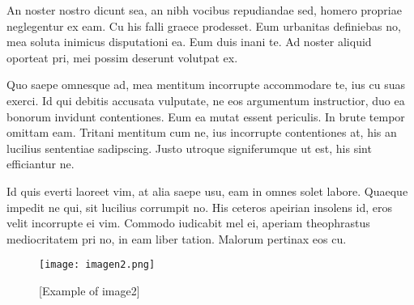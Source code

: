 An noster nostro dicunt sea, an nibh vocibus repudiandae sed, homero propriae neglegentur ex eam. Cu his falli graece prodesset. Eum urbanitas definiebas no, mea soluta inimicus disputationi ea. Eum duis inani te. Ad noster aliquid oporteat pri, mei possim deserunt volutpat ex.

Quo saepe omnesque ad, mea mentitum incorrupte accommodare te, ius cu suas exerci. Id qui debitis accusata vulputate, ne eos argumentum instructior, duo ea bonorum invidunt contentiones. Eum ea mutat essent periculis. In brute tempor omittam eam. Tritani mentitum cum ne, ius incorrupte contentiones at, his an lucilius sententiae sadipscing. Justo utroque signiferumque ut est, his sint efficiantur ne.

Id quis everti laoreet vim, at alia saepe usu, eam in omnes solet labore. Quaeque impedit ne qui, sit lucilius corrumpit no. His ceteros apeirian insolens id, eros velit incorrupte ei vim. Commodo iudicabit mel ei, aperiam theophrastus mediocritatem pri no, in eam liber tation. Malorum pertinax eos cu.

\begin{figure}[h]
\caption{[Example of image2]}
\centering
\texttt{[image: imagen2.png]}
\end{figure}

